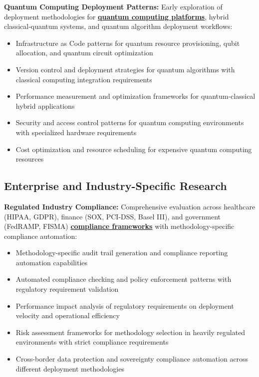 \textbf{Quantum Computing Deployment Patterns:} Early exploration of deployment methodologies for \textbf{\hyperref[quantum_computing]{quantum computing platforms}}, hybrid classical-quantum systems, and quantum algorithm deployment workflows:
\begin{itemize}
\item Infrastructure as Code patterns for quantum resource provisioning, qubit allocation, and quantum circuit optimization
\item Version control and deployment strategies for quantum algorithms with classical computing integration requirements
\item Performance measurement and optimization frameworks for quantum-classical hybrid applications
\item Security and access control patterns for quantum computing environments with specialized hardware requirements
\item Cost optimization and resource scheduling for expensive quantum computing resources
\end{itemize}

\subsection{Enterprise and Industry-Specific Research}
\label{subsec:enterprise_research}

\textbf{Regulated Industry Compliance:} Comprehensive evaluation across healthcare (HIPAA, GDPR), finance (SOX, PCI-DSS, Basel III), and government (FedRAMP, FISMA) \textbf{\hyperref[compliance_frameworks]{compliance frameworks}} with methodology-specific compliance automation:
\begin{itemize}
\item Methodology-specific audit trail generation and compliance reporting automation capabilities
\item Automated compliance checking and policy enforcement patterns with regulatory requirement validation
\item Performance impact analysis of regulatory requirements on deployment velocity and operational efficiency
\item Risk assessment frameworks for methodology selection in heavily regulated environments with strict compliance requirements
\item Cross-border data protection and sovereignty compliance automation across different deployment methodologies
\end{itemize}

